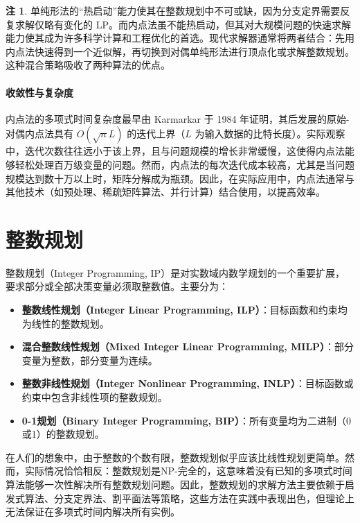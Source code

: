 \documentclass[12pt]{article}
\theoremstyle{plain}
\theoremstyle{definition}
\newtheorem{rmk}{注}[subsection]
\begin{document}
\begin{rmk}
    单纯形法的“热启动”能力使其在整数规划中不可或缺，因为分支定界需要反复求解仅略有变化的 LP。而内点法虽不能热启动，但其对大规模问题的快速求解能力使其成为许多科学计算和工程优化的首选。现代求解器通常将两者结合：先用内点法快速得到一个近似解，再切换到对偶单纯形法进行顶点化或求解整数规划。这种混合策略吸收了两种算法的优点。
\end{rmk}

\paragraph{收敛性与复杂度}
内点法的多项式时间复杂度最早由 Karmarkar 于 1984 年证明，其后发展的原始-对偶内点法具有 $O(\sqrt{n} L)$ 的迭代上界（$L$ 为输入数据的比特长度）。实际观察中，迭代次数往往远小于该上界，且与问题规模的增长非常缓慢，这使得内点法能够轻松处理百万级变量的问题。然而，内点法的每次迭代成本较高，尤其是当问题规模达到数十万以上时，矩阵分解成为瓶颈。因此，在实际应用中，内点法通常与其他技术（如预处理、稀疏矩阵算法、并行计算）结合使用，以提高效率。

\section{整数规划}\label{sec:integer_programming}

整数规划（Integer Programming, IP）是对实数域内数学规划的一个重要扩展，要求部分或全部决策变量必须取整数值。主要分为：
\begin{itemize}
    \item \textbf{整数线性规划（Integer Linear Programming, ILP）}：目标函数和约束均为线性的整数规划。
    \item \textbf{混合整数线性规划（Mixed Integer Linear Programming, MILP）}：部分变量为整数，部分变量为连续。
    \item \textbf{整数非线性规划（Integer Nonlinear Programming, INLP）}：目标函数或约束中包含非线性项的整数规划。
    \item \textbf{0-1规划（Binary Integer Programming, BIP）}：所有变量均为二进制（0或1）的整数规划。
\end{itemize}

在人们的想象中，由于整数的个数有限，整数规划似乎应该比线性规划更简单。然而，实际情况恰恰相反：整数规划是NP-完全的，这意味着没有已知的多项式时间算法能够一次性解决所有整数规划问题。因此，整数规划的求解方法主要依赖于启发式算法、分支定界法、割平面法等策略，这些方法在实践中表现出色，但理论上无法保证在多项式时间内解决所有实例。
\end{document}
